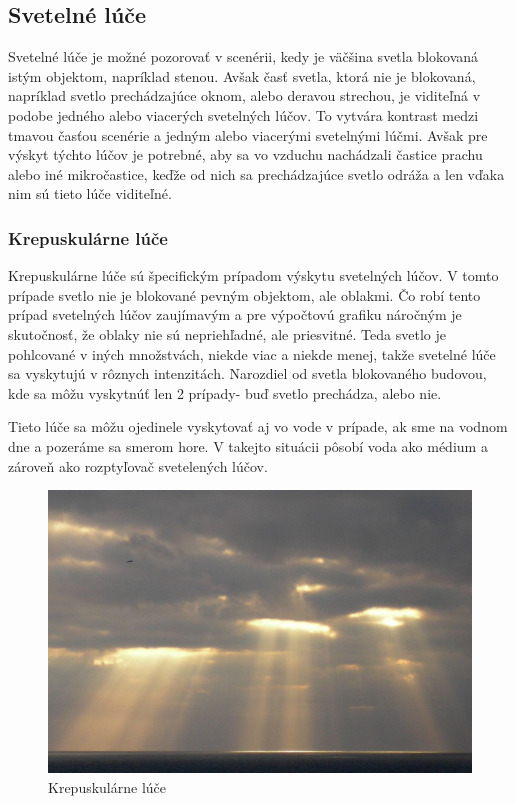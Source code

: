\documentclass[10pt,twoside,slovak,a4paper]{article}
\begin{document}
\subsection{Svetelné lúče} \label{se:luce}
Svetelné lúče je možné pozorovať v scenérii, kedy je väčšina svetla blokovaná istým 
objektom, napríklad stenou. Avšak časť svetla, ktorá nie je blokovaná, napríklad svetlo 
prechádzajúce oknom, alebo deravou strechou, je viditeľná v podobe jedného alebo viacerých 
svetelných lúčov. To vytvára kontrast medzi tmavou časťou scenérie a jedným alebo viacerými 
svetelnými lúčmi. Avšak pre výskyt týchto lúčov je potrebné, aby sa vo vzduchu nachádzali 
častice prachu alebo iné mikročastice, keďže od nich sa prechádzajúce svetlo odráža a 
len vďaka nim sú tieto lúče viditeľné.

\subsubsection{Krepuskulárne lúče} \label{se:luce:kl}
Krepuskulárne lúče sú špecifickým prípadom výskytu svetelných lúčov. V tomto prípade svetlo 
nie je blokované pevným objektom, ale oblakmi. Čo robí tento prípad svetelných lúčov 
zaujímavým a pre výpočtovú grafiku náročným je skutočnosť, že oblaky nie sú nepriehľadné, 
ale priesvitné. Teda svetlo je pohlcované v iných množstvách, niekde viac a niekde menej, 
takže svetelné lúče sa vyskytujú v rôznych intenzitách. Narozdiel od svetla blokovaného 
budovou, kde sa môžu vyskytnúť len 2 prípady- buď svetlo prechádza, 
alebo nie.\cite{Crepuscular_rays}

Tieto lúče sa môžu ojedinele vyskytovať aj vo vode v prípade, ak sme na vodnom dne a 
pozeráme sa smerom hore. V takejto situácii pôsobí voda ako médium a zároveň ako 
rozptyľovač svetelených lúčov. 

\begin{figure}[h]
    \centering
    \includegraphics[scale=0.2]{god_ray.jpg}
    \caption{Krepuskulárne lúče}
    \label{fig:kl}
\end{figure}
\end{document}
